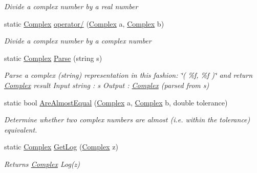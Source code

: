 \begin{DoxyCompactItemize}
\begin{DoxyCompactList}\small\item\em Divide a complex number by a real number \end{DoxyCompactList}\item 
static \mbox{\hyperlink{struct_c_s_i_1_1_library_1_1_data_types_1_1_complex}{Complex}} \mbox{\hyperlink{struct_c_s_i_1_1_library_1_1_data_types_1_1_complex_abd480458280f02b41fc4baa0bc8a5f53}{operator/}} (\mbox{\hyperlink{struct_c_s_i_1_1_library_1_1_data_types_1_1_complex}{Complex}} a, \mbox{\hyperlink{struct_c_s_i_1_1_library_1_1_data_types_1_1_complex}{Complex}} b)
\begin{DoxyCompactList}\small\item\em Divide a complex number by a complex number \end{DoxyCompactList}\item 
static \mbox{\hyperlink{struct_c_s_i_1_1_library_1_1_data_types_1_1_complex}{Complex}} \mbox{\hyperlink{struct_c_s_i_1_1_library_1_1_data_types_1_1_complex_ad9740140a5ccf87ff113f2b6c1ca87dd}{Parse}} (string s)
\begin{DoxyCompactList}\small\item\em Parse a complex (string) representation in this fashion\+: \char`\"{}( \%f, \%f )\char`\"{} and return \mbox{\hyperlink{struct_c_s_i_1_1_library_1_1_data_types_1_1_complex}{Complex}} result Input string \+: s Output \+: \mbox{\hyperlink{struct_c_s_i_1_1_library_1_1_data_types_1_1_complex}{Complex}} (parsed from s) \end{DoxyCompactList}\item 
static bool \mbox{\hyperlink{struct_c_s_i_1_1_library_1_1_data_types_1_1_complex_af1c851d4fcb54445cb3b50ff9e468029}{Are\+Almost\+Equal}} (\mbox{\hyperlink{struct_c_s_i_1_1_library_1_1_data_types_1_1_complex}{Complex}} a, \mbox{\hyperlink{struct_c_s_i_1_1_library_1_1_data_types_1_1_complex}{Complex}} b, double tolerance)
\begin{DoxyCompactList}\small\item\em Determine whether two complex numbers are almost (i.\+e. within the tolerance) equivalent. \end{DoxyCompactList}\item 
static \mbox{\hyperlink{struct_c_s_i_1_1_library_1_1_data_types_1_1_complex}{Complex}} \mbox{\hyperlink{struct_c_s_i_1_1_library_1_1_data_types_1_1_complex_a935a7f7138240e3e3e270975700449d4}{Get\+Log}} (\mbox{\hyperlink{struct_c_s_i_1_1_library_1_1_data_types_1_1_complex}{Complex}} z)
\begin{DoxyCompactList}\small\item\em Returns \mbox{\hyperlink{struct_c_s_i_1_1_library_1_1_data_types_1_1_complex}{Complex}} Log(z) \end{DoxyCompactList}\item 

\end{DoxyCompactItemize}
